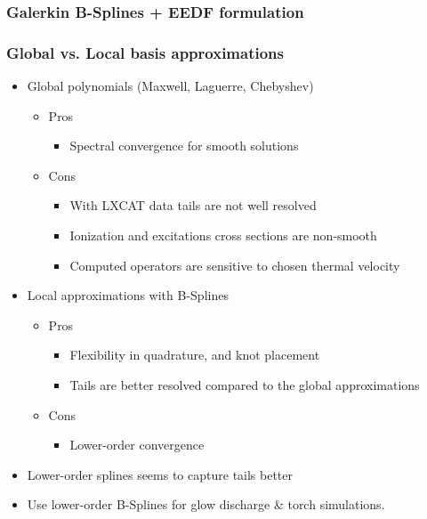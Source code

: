 \documentclass[mathserif, aspectratio=169]{beamer}
\begin{document}
\begin{frame}
	\frametitle{Galerkin B-Splines + EEDF formulation}
	\begin{figure}
	\end{figure}
\end{frame}

\begin{frame}
	\frametitle{Global vs. Local basis approximations}
	\begin{itemize}
		\item Global polynomials (Maxwell, Laguerre, Chebyshev)
		\begin{itemize}
			\item Pros
			\begin{itemize}
				\item Spectral convergence for smooth solutions
			\end{itemize}
			\item Cons
			\begin{itemize}
				\item With LXCAT data tails are not well resolved 
				\item Ionization and excitations cross sections are non-smooth%
				\item Computed operators are sensitive to chosen thermal velocity
			\end{itemize}
		\end{itemize}
		\item Local approximations with B-Splines
		\begin{itemize}
			\item Pros
			\begin{itemize}
				\item Flexibility in quadrature, and knot placement
				\item Tails are better resolved compared to the global approximations
			\end{itemize}
			\item Cons
			\begin{itemize}
				\item Lower-order convergence
			\end{itemize}
		\end{itemize}
	\end{itemize}
	\begin{itemize}
		\item Lower-order splines seems to capture tails better 
		\item Use lower-order B-Splines for glow discharge \& torch simulations. %
	\end{itemize}
\end{frame}
\end{document}

